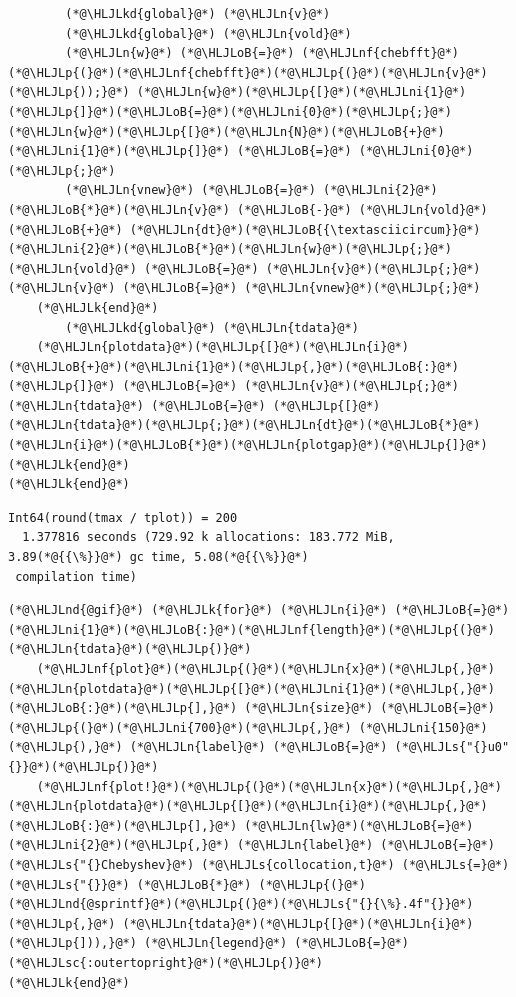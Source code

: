 \documentclass[12pt,a4paper]{article}
\newcommand{\HLJLk}[1]{\textcolor[RGB]{148,91,176}{\textbf{#1}}}
\newcommand{\HLJLkd}[1]{\textcolor[RGB]{214,102,97}{\textit{#1}}}
\newcommand{\HLJLn}[1]{#1}
\newcommand{\HLJLnd}[1]{\textcolor[RGB]{214,102,97}{#1}}
\newcommand{\HLJLnf}[1]{\textcolor[RGB]{66,102,213}{#1}}
\newcommand{\HLJLs}[1]{\textcolor[RGB]{201,61,57}{#1}}
\newcommand{\HLJLsc}[1]{\textcolor[RGB]{201,61,57}{#1}}
\newcommand{\HLJLni}[1]{\textcolor[RGB]{59,151,46}{#1}}
\newcommand{\HLJLoB}[1]{\textcolor[RGB]{102,102,102}{\textbf{#1}}}
\newcommand{\HLJLp}[1]{#1}
\begin{document}
\begin{lstlisting}
        (*@\HLJLkd{global}@*) (*@\HLJLn{v}@*)
        (*@\HLJLkd{global}@*) (*@\HLJLn{vold}@*)
        (*@\HLJLn{w}@*) (*@\HLJLoB{=}@*) (*@\HLJLnf{chebfft}@*)(*@\HLJLp{(}@*)(*@\HLJLnf{chebfft}@*)(*@\HLJLp{(}@*)(*@\HLJLn{v}@*)(*@\HLJLp{));}@*) (*@\HLJLn{w}@*)(*@\HLJLp{[}@*)(*@\HLJLni{1}@*)(*@\HLJLp{]}@*)(*@\HLJLoB{=}@*)(*@\HLJLni{0}@*)(*@\HLJLp{;}@*) (*@\HLJLn{w}@*)(*@\HLJLp{[}@*)(*@\HLJLn{N}@*)(*@\HLJLoB{+}@*)(*@\HLJLni{1}@*)(*@\HLJLp{]}@*) (*@\HLJLoB{=}@*) (*@\HLJLni{0}@*)(*@\HLJLp{;}@*)
        (*@\HLJLn{vnew}@*) (*@\HLJLoB{=}@*) (*@\HLJLni{2}@*)(*@\HLJLoB{*}@*)(*@\HLJLn{v}@*) (*@\HLJLoB{-}@*) (*@\HLJLn{vold}@*) (*@\HLJLoB{+}@*) (*@\HLJLn{dt}@*)(*@\HLJLoB{{\textasciicircum}}@*)(*@\HLJLni{2}@*)(*@\HLJLoB{*}@*)(*@\HLJLn{w}@*)(*@\HLJLp{;}@*) (*@\HLJLn{vold}@*) (*@\HLJLoB{=}@*) (*@\HLJLn{v}@*)(*@\HLJLp{;}@*) (*@\HLJLn{v}@*) (*@\HLJLoB{=}@*) (*@\HLJLn{vnew}@*)(*@\HLJLp{;}@*)
    (*@\HLJLk{end}@*)
        (*@\HLJLkd{global}@*) (*@\HLJLn{tdata}@*)
    (*@\HLJLn{plotdata}@*)(*@\HLJLp{[}@*)(*@\HLJLn{i}@*)(*@\HLJLoB{+}@*)(*@\HLJLni{1}@*)(*@\HLJLp{,}@*)(*@\HLJLoB{:}@*)(*@\HLJLp{]}@*) (*@\HLJLoB{=}@*) (*@\HLJLn{v}@*)(*@\HLJLp{;}@*) (*@\HLJLn{tdata}@*) (*@\HLJLoB{=}@*) (*@\HLJLp{[}@*)(*@\HLJLn{tdata}@*)(*@\HLJLp{;}@*)(*@\HLJLn{dt}@*)(*@\HLJLoB{*}@*)(*@\HLJLn{i}@*)(*@\HLJLoB{*}@*)(*@\HLJLn{plotgap}@*)(*@\HLJLp{]}@*)
(*@\HLJLk{end}@*)
(*@\HLJLk{end}@*)
\end{lstlisting}

\begin{lstlisting}
Int64(round(tmax / tplot)) = 200
  1.377816 seconds (729.92 k allocations: 183.772 MiB, 3.89(*@{{\%}}@*) gc time, 5.08(*@{{\%}}@*)
 compilation time)
\end{lstlisting}


\begin{lstlisting}
(*@\HLJLnd{@gif}@*) (*@\HLJLk{for}@*) (*@\HLJLn{i}@*) (*@\HLJLoB{=}@*) (*@\HLJLni{1}@*)(*@\HLJLoB{:}@*)(*@\HLJLnf{length}@*)(*@\HLJLp{(}@*)(*@\HLJLn{tdata}@*)(*@\HLJLp{)}@*)
    (*@\HLJLnf{plot}@*)(*@\HLJLp{(}@*)(*@\HLJLn{x}@*)(*@\HLJLp{,}@*) (*@\HLJLn{plotdata}@*)(*@\HLJLp{[}@*)(*@\HLJLni{1}@*)(*@\HLJLp{,}@*)(*@\HLJLoB{:}@*)(*@\HLJLp{],}@*) (*@\HLJLn{size}@*) (*@\HLJLoB{=}@*) (*@\HLJLp{(}@*)(*@\HLJLni{700}@*)(*@\HLJLp{,}@*) (*@\HLJLni{150}@*)(*@\HLJLp{),}@*) (*@\HLJLn{label}@*) (*@\HLJLoB{=}@*) (*@\HLJLs{"{}u0"{}}@*)(*@\HLJLp{)}@*)
    (*@\HLJLnf{plot!}@*)(*@\HLJLp{(}@*)(*@\HLJLn{x}@*)(*@\HLJLp{,}@*) (*@\HLJLn{plotdata}@*)(*@\HLJLp{[}@*)(*@\HLJLn{i}@*)(*@\HLJLp{,}@*)(*@\HLJLoB{:}@*)(*@\HLJLp{],}@*) (*@\HLJLn{lw}@*)(*@\HLJLoB{=}@*)(*@\HLJLni{2}@*)(*@\HLJLp{,}@*) (*@\HLJLn{label}@*) (*@\HLJLoB{=}@*) (*@\HLJLs{"{}Chebyshev}@*) (*@\HLJLs{collocation,t}@*) (*@\HLJLs{=}@*) (*@\HLJLs{"{}}@*) (*@\HLJLoB{*}@*) (*@\HLJLp{(}@*)(*@\HLJLnd{@sprintf}@*)(*@\HLJLp{(}@*)(*@\HLJLs{"{}{\%}.4f"{}}@*)(*@\HLJLp{,}@*) (*@\HLJLn{tdata}@*)(*@\HLJLp{[}@*)(*@\HLJLn{i}@*)(*@\HLJLp{])),}@*) (*@\HLJLn{legend}@*) (*@\HLJLoB{=}@*) (*@\HLJLsc{:outertopright}@*)(*@\HLJLp{)}@*)
(*@\HLJLk{end}@*)
\end{lstlisting}
\end{document}
